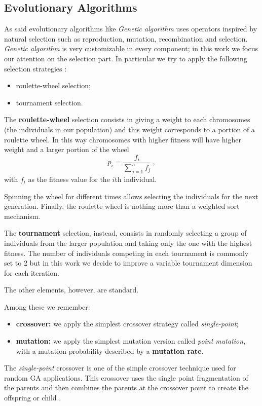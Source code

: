 \documentclass[10pt]{article}
\begin{document}
\subsection{Evolutionary Algorithms}
As said evolutionary algorithms like \textit{Genetic algorithm} uses operators inspired by natural selection such as reproduction, mutation, recombination and selection.
\textit{Genetic algorithm} is very customizable in every component; in this work we focus our attention on the selection part.
In particular we try to apply the following selection strategies \cite{ventuno}:
\begin{itemize}
\item roulette-wheel selection;
\item tournament selection.
\end{itemize}
The \textbf{roulette-wheel} selection consists in giving a weight to each chromosomes (the individuals in our population) and this weight corresponds to a portion of a roulette wheel.
In this way chromosomes with higher fitness will have higher weight and a larger portion of the wheel
\begin{equation}
p_i = \frac{f_i}{\sum_{j = 1}^n f_j} ~,
\end{equation}
with $f_i$ as the fitness value for the $i$th individual.

Spinning the wheel for different times allows selecting the individuals for the next generation.
Finally, the roulette wheel is nothing more than a weighted sort mechanism.

The \textbf{tournament} selection, instead, consists in randomly selecting a group of individuals from the larger population and taking only the one with the highest fitness. 
The number of individuals competing in each tournament is commonly set to 2 but in this work we decide to improve a variable tournament dimension for each iteration.

The other elements, however, are standard.

Among these we remember:
\begin{itemize}
\item \textbf{crossover:} we apply the simplest crossover strategy called \textit{single-point};
\item \textbf{mutation:} we apply the simplest mutation version called \textit{point mutation}, with a mutation probability described by a \textbf{mutation rate}.
\end{itemize}
The \textit{single-point} crossover is one of the simple crossover technique used for random GA applications. This crossover uses the single point fragmentation of the parents and then combines the parents at the crossover point to create the offspring or child \cite{venticinque}.
\end{document}
